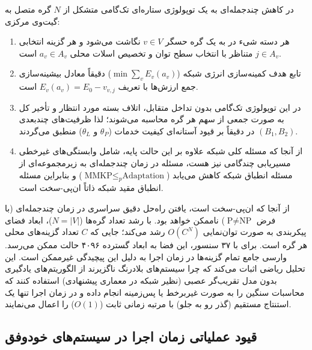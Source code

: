 \documentclass[oneside,openany,phd]{TMU-Thesis}
\begin{document}
در کاهش چندجمله‌ای به یک توپولوژی ستاره‌ای تک‌گامی متشکل از $N$ گره متصل به گیت‌وی مرکزی:
\begin{enumerate}
    \item هر دسته شیء در  به یک گره حسگر $v \in V$ نگاشت می‌شود و هر گزینه انتخابی $j \in A_v$ متناظر با انتخاب سطح توان و تخصیص اسلات محلی $a_v \in A_v$ است.
    \item تابع هدف کمینه‌سازی انرژی شبکه ($\min \sum_v E_v(a_v)$) دقیقاً معادل بیشینه‌سازی جمع ارزش‌ها با تعریف $E_v(a_v) = E_0 - v_{v,j}$ است.
    \item در این توپولوژی تک‌گامی بدون تداخل متقابل، اتلاف بسته مورد انتظار و تأخیر کل به صورت جمعی از سهم هر گره محاسبه می‌شوند؛ لذا ظرفیت‌های چندبعدی $(B_1, B_2)$ در  دقیقاً بر قیود آستانه‌ای کیفیت خدمات ($\theta_P$ و $\theta_L$) منطبق می‌گردند.
    \item از آنجا که مسئله کلی شبکه  علاوه بر این حالت پایه، شامل وابستگی‌های غیرخطی مسیریابی چندگامی نیز هست، مسئله  در زمان چندجمله‌ای به زیرمجموعه‌ای از مسئله انطباق شبکه کاهش می‌یابد ($\text{MMKP} \le_p \text{Adaptation}$) و بنابراین مسئله انطباق مقید شبکه ذاتاً ان‌پی-سخت است.
\end{enumerate}

از آنجا که  ان‌پی-سخت است، یافتن راه‌حل دقیق سراسری در زمان چندجمله‌ای (با فرض $\text{P} \neq \text{NP}$) ناممکن خواهد بود. با رشد تعداد گره‌ها ($N = |V|$)، ابعاد فضای پیکربندی به صورت توان‌نمایی $O(C^N)$ رشد می‌کند؛ جایی که $C$ تعداد گزینه‌های محلی هر گره است. برای  با ۳۷ سنسور، این فضا به ابعاد گسترده ۴۰۹۶ حالت ممکن می‌رسد. وارسی جامع تمام گزینه‌ها در زمان اجرا به دلیل این پیچیدگی غیرممکن است. این تحلیل ریاضی اثبات می‌کند که چرا سیستم‌های بلادرنگ ناگزیرند از الگوریتم‌های یادگیری بدون مدل تقریب‌گر عصبی (نظیر شبکه  در معماری پیشنهادی) استفاده کنند که محاسبات سنگین را به صورت غیربرخط یا پس‌زمینه انجام داده و در زمان اجرا تنها یک استنتاج مستقیم (گذر رو به جلو) با مرتبه زمانی ثابت ($O(1)$) را اعمال می‌نمایند.

\subsection{قیود عملیاتی زمان اجرا در سیستم‌های خودوفق}
\end{document}
